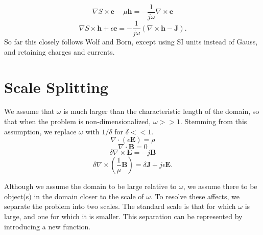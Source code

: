 \documentclass{article}
\theoremstyle{plain}
\begin{document}
\begin{equation}\label{eq:max3}
	\nabla S\times\mathbf{e} - \mu\mathbf{h} = -\frac{1}{j\omega}\nabla\times\mathbf{e}
\end{equation}
\begin{equation}\label{eq:max4}
	\nabla S\times\mathbf{h} + \epsilon\mathbf{e} = -\frac{1}{j\omega}\left( \nabla\times\mathbf{h} - \mathbf{J} \right).
\end{equation}
So far this closely follows Wolf and Born, except using SI units instead of Gauss, and retaining charges and currents.

\section{Scale Splitting}\label{sec:scaleSplit}

We assume that $\omega$ is much larger than the characteristic length of the domain, so that when the problem is non-dimensionalized, $\omega >> 1$. Stemming from this assumption, we replace $\omega$ with $1/\delta$ for $\delta<<1$.
\begin{equation}\label{eq:max1a}
	\nabla\cdot\left(\epsilon\mathbf{E}\right) = \rho
\end{equation}
\begin{equation}\label{eq:max2a}
	\nabla\cdot\mathbf{B} = 0
\end{equation}
\begin{equation}\label{eq:max3a}
	\delta\nabla\times\mathbf{E} = -j\mathbf{B}
\end{equation}
\begin{equation}\label{eq:max4a}
	\delta\nabla\times\left(\frac{1}{\mu}\mathbf{B}\right) = \delta\mathbf{J} + j\epsilon\mathbf{E}.
\end{equation}

Although we assume the domain to be large relative to $\omega$, we assume there to be object(s) in the domain closer to the scale of $\omega$. To resolve these affects, we separate the problem into two scales. The standard scale is that for which $\omega$ is large, and one for which it is smaller. This separation can be represented by introducing a new function.
\end{document}
